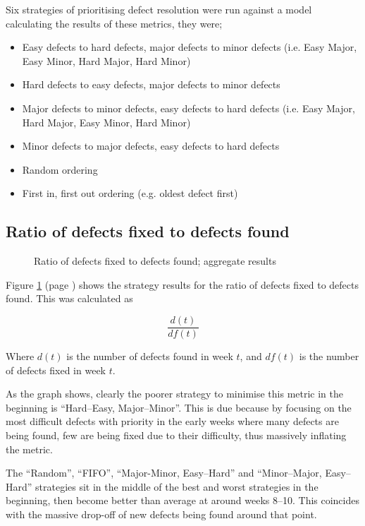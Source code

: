 \documentclass[a4paper,10pt]{article}
\begin{document}
Six strategies of prioritising defect resolution were run against a model calculating the results of these metrics, they were;
\begin{itemize}
 \item Easy defects to hard defects, major defects to minor defects (i.e. Easy Major, Easy Minor, Hard Major, Hard Minor)
 \item Hard defects to easy defects, major defects to minor defects
 \item Major defects to minor defects, easy defects to hard defects (i.e. Easy Major, Hard Major, Easy Minor, Hard Minor)
 \item Minor defects to major defects, easy defects to hard defects
 \item Random ordering
 \item First in, first out ordering (e.g. oldest defect first)
\end{itemize}
  
\subsection{Ratio of defects fixed to defects found}
\begin{figure}
  \centering
  
  \caption{Ratio of defects fixed to defects found; aggregate results}
  \label{agg:dfdf}
\end{figure}

Figure \ref{agg:dfdf} (page \pageref{agg:dfdf}) shows the strategy results for the ratio of defects fixed to defects found. This was calculated as

$$\frac{d(t)}{\mathit{df}(t)}$$

Where $d(t)$ is the number of defects found in week $t$, and $\mathit{df}(t)$ is the number of defects fixed in week $t$.

As the graph shows, clearly the poorer strategy to minimise this metric in the beginning is ``Hard--Easy, Major--Minor''. This is due because by focusing on the most difficult defects with priority in the early weeks where many defects are being found, few are being fixed due to their difficulty, thus massively inflating the metric.

The ``Random'', ``FIFO'', ``Major-Minor, Easy--Hard'' and ``Minor--Major, Easy--Hard'' strategies sit in the middle of the best and worst strategies in the beginning, then become better than average at around weeks 8--10. This coincides with the massive drop-off of new defects being found around that point.
\end{document}
